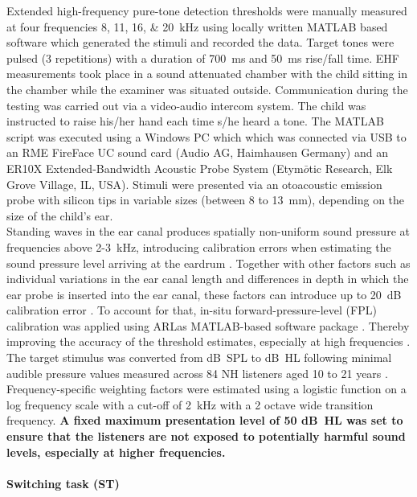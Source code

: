 \documentclass[a4paper, twoside]{templates/ociamthesis}
\begin{document}
Extended high-frequency pure-tone detection thresholds were manually measured at four frequencies 8, 11, 16, \& 20~kHz using locally written MATLAB based software which generated the stimuli and recorded the data. Target tones were pulsed (3 repetitions) with a duration of 700~ms and 50~ms rise/fall time. EHF measurements took place in a sound attenuated chamber with the child sitting in the chamber while the examiner was situated outside. Communication during the testing was carried out via a video-audio intercom system. The child was instructed to raise his/her hand each time s/he heard a tone. The MATLAB script was executed using a Windows PC which which was connected via USB to an RME FireFace UC sound card (Audio AG, Haimhausen Germany) and an ER10X Extended-Bandwidth Acoustic Probe System (Etym\(\bar{o}\)tic Research, Elk Grove Village, IL, USA). Stimuli were presented via an otoacoustic emission probe with silicon tips in variable sizes (between 8 to 13~mm), depending on the size of the child's ear.\\

Standing waves in the ear canal produces spatially non-uniform sound pressure at frequencies above 2-3~kHz, introducing calibration errors when estimating the sound pressure level arriving at the eardrum \autocite{Siegel1994,Richmond2011,Lee2012}. Together with other factors such as individual variations in the ear canal length and differences in depth in which the ear probe is inserted into the ear canal, these factors can introduce up to 20~dB calibration error \autocite{Siegel1994}. To account for that, in-situ forward-pressure-level (FPL) calibration was applied using ARLas MATLAB-based software package \autocite{ARLas}. Thereby improving the accuracy of the threshold estimates, especially at high frequencies \autocite{Lewis2009}. The target stimulus was converted from dB~SPL to dB~HL following minimal audible pressure values measured across 84 NH listeners aged 10 to 21 years \autocite[see Table 1 in][]{Lee2012}. Frequency-specific weighting factors were estimated using a logistic function on a log frequency scale with a cut-off of 2~kHz with a 2 octave wide transition frequency. \textbf{A fixed maximum presentation level of 50 dB~HL was set to ensure that the listeners are not exposed to potentially harmful sound levels, especially at higher frequencies.}\\

\hypertarget{switching-task-st}{%
\paragraph{Switching task (ST)}\label{switching-task-st}}
\end{document}
